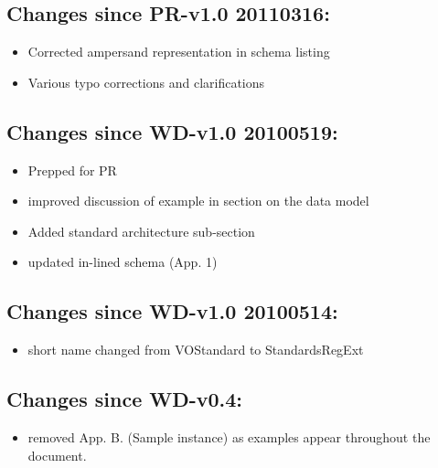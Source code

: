 \documentclass[11pt,a4paper]{ivoa}
\begin{document}
\subsection{Changes since PR-v1.0 20110316:}

\begin{itemize}

\item Corrected ampersand representation in schema listing

\item Various typo corrections and clarifications

\end{itemize}

\subsection{Changes since WD-v1.0 20100519:}

\begin{itemize}

\item  Prepped for PR 

\item  improved discussion of example in section on the data model

\item  Added standard architecture sub-section

\item  updated in-lined schema (App. 1)

\end{itemize}

\subsection{Changes since WD-v1.0 20100514:}

\begin{itemize}

\item  short name changed from VOStandard to StandardsRegExt

\end{itemize}

\subsection{Changes since WD-v0.4:}

\begin{itemize}

\item  removed App. B. (Sample instance) as examples appear throughout
       the document.

\end{itemize}


\end{document}
